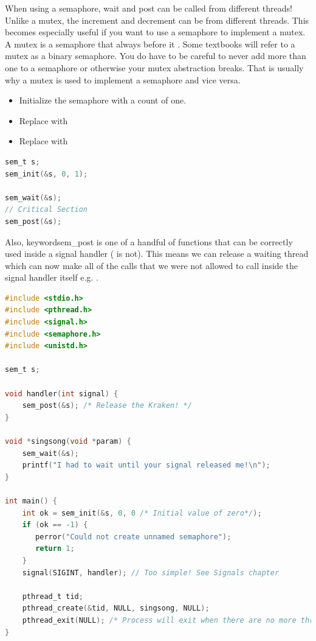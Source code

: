 When using a semaphore, wait and post can be called from different threads!
Unlike a mutex, the increment and decrement can be from different threads.
This becomes especially useful if you want to use a semaphore to implement a mutex.
A mutex is a semaphore that always  before it .
Some textbooks will refer to a mutex as a binary semaphore.
You do have to be careful to never add more than one to a semaphore or otherwise your mutex abstraction breaks.
That is usually why a mutex is used to implement a semaphore and vice versa.

\begin{itemize}
\item Initialize the semaphore with a count of one. 
\item Replace  with  
\item Replace  with 
\end{itemize}

\begin{lstlisting}[language=C]
sem_t s;
sem_init(&s, 0, 1);

sem_wait(&s);
// Critical Section
sem_post(&s);
\end{lstlisting}

Also, keyword{sem\_post} is one of a handful of functions that can be correctly used inside a signal handler ( is not).
This means we can release a waiting thread which can now make all of the calls that we were not allowed to call inside the signal handler itself e.g. .

\begin{lstlisting}[language=C]
#include <stdio.h>
#include <pthread.h>
#include <signal.h>
#include <semaphore.h>
#include <unistd.h>

sem_t s;

void handler(int signal) {
    sem_post(&s); /* Release the Kraken! */
}

void *singsong(void *param) {
    sem_wait(&s);
    printf("I had to wait until your signal released me!\n");
}

int main() {
    int ok = sem_init(&s, 0, 0 /* Initial value of zero*/); 
    if (ok == -1) {
       perror("Could not create unnamed semaphore");
       return 1;
    }
    signal(SIGINT, handler); // Too simple! See Signals chapter

    pthread_t tid;
    pthread_create(&tid, NULL, singsong, NULL);
    pthread_exit(NULL); /* Process will exit when there are no more threads */
}
\end{lstlisting}

